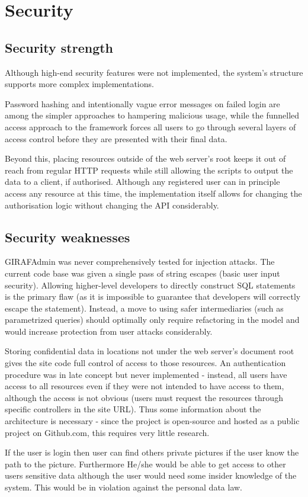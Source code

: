 \section{Security}


\subsection{Security strength }
Although high-end security features were not implemented, the system's structure supports more complex implementations.

Password hashing and intentionally vague error messages on failed login are among the simpler approaches to hampering malicious usage, while the funnelled access approach to the framework forces all users to go through several layers of access control before they are presented with their final data.

Beyond this, placing resources outside of the web server's root keeps it out of reach from regular HTTP requests while still allowing the scripts to output the data to a client, if authorised. Although any registered user can in principle access any resource at this time, the implementation itself allows for changing the authorisation logic without changing the API considerably.

\subsection{Security weaknesses}
GIRAFAdmin was never comprehensively tested for injection attacks. The current code base was given a single pass of string escapes (basic user input security). Allowing higher-level developers to directly construct SQL statements is the primary flaw (as it is impossible to guarantee that developers will correctly escape the statement). Instead, a move to using safer intermediaries (such as parametrized queries) should optimally only require refactoring in the model and would increase protection from user attacks considerably. 

Storing confidential data in locations not under the web server's document root gives the site code full control of access to those resources. An authentication procedure was in late concept but never implemented - instead, all users have access to all resources even if they were not intended to have access to them, although the access is not obvious (users must request the resources through specific controllers in the site URL). Thus some information about the architecture is necessary - since the project is open-source and hosted as a public project on Github.com, this requires very little research. 

If the user is login then user can find others private pictures if the user know the path to the picture. Furthermore He/she would be able to get access to other users sensitive data although the user would need some insider knowledge of the system.
This would be in violation against the personal data law.

